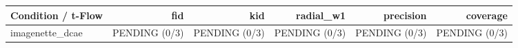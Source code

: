 \begin{tabular}{lrrrrr}
\hline
Condition / t-Flow & fid & kid & radial\_w1 & precision & coverage \\
\hline
imagenette\_dcae & PENDING (0/3) & PENDING (0/3) & PENDING (0/3) & PENDING (0/3) & PENDING (0/3) \\
\hline
\end{tabular}

